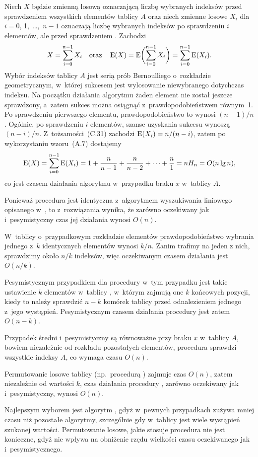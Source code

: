 \subproblem %
Niech $X$ będzie zmienną losową oznaczającą liczbę wybranych indeksów przed sprawdzeniem wszystkich elementów tablicy $A$ oraz niech zmienne losowe $X_i$ dla $i=0$, 1,~\dots,~$n-1$ oznaczają liczbę wybranych indeksów po sprawdzeniu $i$ elementów, ale przed sprawdzeniem . Zachodzi
\[
	X = \sum_{i=0}^{n-1}X_i \quad\text{oraz}\quad \operatorname{E}(X) = \operatorname{E}\biggl(\sum_{i=0}^{n-1}X_i\biggr) = \sum_{i=0}^{n-1}\operatorname{E}(X_i).
\]
Wybór indeksów tablicy $A$ jest serią prób Bernoulliego o~rozkładzie geometrycznym, w~której sukcesem jest wylosowanie niewybranego dotychczas indeksu. Na początku działania algorytmu żaden element nie został jeszcze sprawdzony, a~zatem sukces można osiągnąć z~prawdopodobieństwem równym~1. Po sprawdzeniu pierwszego elementu, prawdopodobieństwo to wynosi $(n-1)/n$. Ogólnie, po sprawdzeniu $i$ elementów, szanse uzyskania sukcesu wynoszą $(n-i)/n$. Z~tożsamości~(C.31) zachodzi $\operatorname{E}(X_i)=n/(n-i)$, zatem po wykorzystaniu wzoru~(A.7) dostajemy
\[
	\operatorname{E}(X) = \sum_{i=0}^{n-1}\operatorname{E}(X_i) = 1+\frac{n}{n-1}+\frac{n}{n-2}+\dots+\frac{n}{1} = nH_n = O(n\lg n),
\]
co jest czasem działania algorytmu  w~przypadku braku $x$ w~tablicy $A$.

\subproblem %
Ponieważ procedura  jest identyczna z~algorytmem wyszukiwania liniowego opisanego w~, to z~rozwiązania  wynika, że zarówno oczekiwany jak i~pesymistyczny czas jej działania wynosi $O(n)$.

\subproblem %
W~tablicy  o~przypadkowym rozkładzie elementów prawdopodobieństwo wybrania jednego z~$k$ identycznych elementów wynosi $k/n$. Zanim trafimy na jeden z nich, sprawdzimy około $n/k$ indeksów, więc oczekiwanym czasem działania jest $O(n/k)$.

Pesymistycznym przypadkiem dla procedury w~tym przypadku jest takie ustawienie $k$ elementów w~tablicy , w~którym zajmują one $k$ końcowych pozycji, kiedy to należy sprawdzić $n-k$ komórek tablicy przed odnalezieniem jednego z~jego wystąpień. Pesymistycznym czasem działania procedury jest zatem $O(n-k)$.

\subproblem %
Przypadek średni i~pesymistyczny są równoważne przy braku $x$ w~tablicy $A$, bowiem niezależnie od rozkładu pozostałych elementów, procedura sprawdzi wszystkie indeksy $A$, co wymaga czasu $O(n)$.

\subproblem %
Permutowanie losowe tablicy (np.\ procedurą ) zajmuje czas $O(n)$, zatem niezależnie od wartości $k$, czas działania procedury , zarówno oczekiwany jak i~pesymistyczny, wynosi $O(n)$.

\subproblem %
Najlepszym wyborem jest algorytm , gdyż w~pewnych przypadkach zużywa mniej czasu niż pozostałe algorytmy, szczególnie gdy w~tablicy jest wiele wystąpień szukanej wartości. Permutowanie losowe, jakie stosuje procedura  nie jest konieczne, gdyż nie wpływa na obniżenie rzędu wielkości czasu oczekiwanego jak i~pesymistycznego.

\endinput
